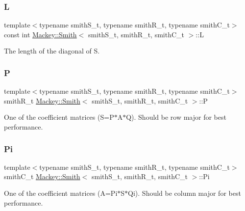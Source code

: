 \subsubsection{\texorpdfstring{L}{L}}
{\footnotesize\ttfamily template$<$typename smith\+S\+\_\+t, typename smith\+R\+\_\+t, typename smith\+C\+\_\+t$>$ \\
const int \hyperlink{classMackey_1_1Smith}{Mackey\+::\+Smith}$<$ smith\+S\+\_\+t, smith\+R\+\_\+t, smith\+C\+\_\+t $>$\+::L}



The length of the diagonal of S. 

\mbox{\label{classMackey_1_1Smith_a5a831316edd85dedc7394b39fda103a2}} 
\subsubsection{\texorpdfstring{P}{P}}
{\footnotesize\ttfamily template$<$typename smith\+S\+\_\+t, typename smith\+R\+\_\+t, typename smith\+C\+\_\+t$>$ \\
smith\+R\+\_\+t \hyperlink{classMackey_1_1Smith}{Mackey\+::\+Smith}$<$ smith\+S\+\_\+t, smith\+R\+\_\+t, smith\+C\+\_\+t $>$\+::P}



One of the coefficient matrices (S=P$\ast$\+A$\ast$Q). Should be row major for best performance. 

\mbox{\label{classMackey_1_1Smith_a97f16eca1aa9f4f6c36c2680fdcf277e}} 
\subsubsection{\texorpdfstring{Pi}{Pi}}
{\footnotesize\ttfamily template$<$typename smith\+S\+\_\+t, typename smith\+R\+\_\+t, typename smith\+C\+\_\+t$>$ \\
smith\+C\+\_\+t \hyperlink{classMackey_1_1Smith}{Mackey\+::\+Smith}$<$ smith\+S\+\_\+t, smith\+R\+\_\+t, smith\+C\+\_\+t $>$\+::Pi}



One of the coefficient matrices (A=Pi$\ast$\+S$\ast$\+Qi). Should be column major for best performance. 

\mbox{\label{classMackey_1_1Smith_af93f16dfd0ce77406d9696a026092306}} 
